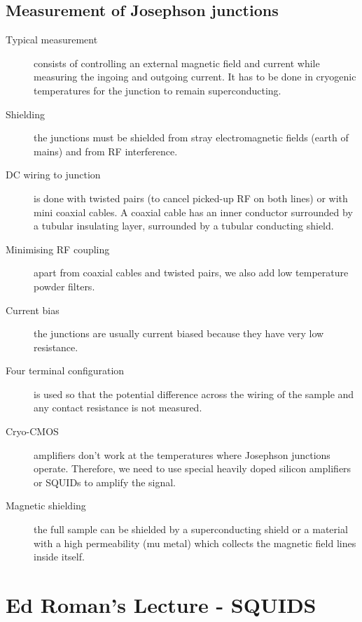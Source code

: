 \subsection{Measurement of Josephson junctions}
\begin{description}
\item[Typical measurement] consists of controlling an external magnetic field and current while measuring the ingoing and outgoing current. It has to be done in cryogenic temperatures for the junction to remain superconducting. 

\item[Shielding] the junctions must be shielded from stray electromagnetic fields (earth of mains) and from RF interference. 

\item[DC wiring to junction] is done with twisted pairs (to cancel picked-up RF on both lines) or with mini coaxial cables. A coaxial cable has an inner conductor surrounded by a tubular insulating layer, surrounded by a tubular conducting shield. 

\item[Minimising RF coupling] apart from coaxial cables and twisted pairs, we also add low temperature powder filters. 

\item[Current bias] the junctions are usually current biased because they have very low resistance. 

\item[Four terminal configuration] is used so that the potential difference across the wiring of the sample and any contact resistance is not measured. 

\item[Cryo-CMOS] amplifiers don't work at the temperatures where Josephson junctions operate. Therefore, we need to use special heavily doped silicon amplifiers or SQUIDs to amplify the signal. 

\item[Magnetic shielding] the full sample can be shielded by a superconducting shield or a material with a high permeability (mu metal) which collects the magnetic field lines inside itself. 

\end{description}

\section{Ed Roman's Lecture - SQUIDS}
